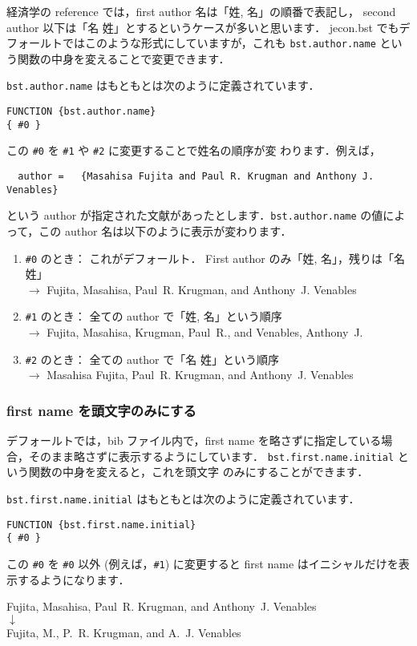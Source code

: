 \documentclass[a4j,10pt]{jarticle}
\begin{document}
経済学の reference では，first author 名は「姓, 名」の順番で表記し，
second author 以下は「名 姓」とするというケースが多いと思います． 
jecon.bst でもデフォールトではこのような形式にしていますが，これも 
\texttt{bst.author.name} という関数の中身を変えることで変更できます．

\texttt{bst.author.name} はもともとは次のように定義されています．
\begin{screen}
\begin{verbatim}
FUNCTION {bst.author.name}
{ #0 }
\end{verbatim}
\end{screen}
この \verb|#0| を \verb|#1| や \verb|#2| に変更することで姓名の順序が変
わります．例えば，
\begin{verbatim}
  author =	 {Masahisa Fujita and Paul R. Krugman and Anthony J. Venables}
\end{verbatim}
という author が指定された文献があったとします．\texttt{bst.author.name} 
の値によって，この author 名は以下のように表示が変わります．
\begin{enumerate}
 \item \verb|#0| のとき： これがデフォールト． First author のみ「姓, 
       名」，残りは「名 姓」\\
       $\rightarrow$ Fujita, Masahisa, Paul~R. Krugman, and
       Anthony~J. Venables
 \item \verb|#1| のとき： 全ての author で「姓, 名」という順序\\
       $\rightarrow$ Fujita, Masahisa, Krugman, Paul~R., and Venables, Anthony~J.
 \item \verb|#2| のとき： 全ての author で「名 姓」という順序\\
       $\rightarrow$ Masahisa Fujita, Paul~R. Krugman, and Anthony~J. Venables
\end{enumerate}

\subsubsection{first name を頭文字のみにする}

デフォールトでは，bib ファイル内で，first name を略さずに指定している場
合，そのまま略さずに表示するようにしています．
\texttt{bst.first.name.initial} という関数の中身を変えると，これを頭文字
のみにすることができます．

\texttt{bst.first.name.initial} はもともとは次のように定義されています．
\begin{screen}
\begin{verbatim}
FUNCTION {bst.first.name.initial}
{ #0 }
\end{verbatim}
\end{screen}
この \verb|#0| を \verb|#0| 以外 (例えば，\verb|#1|) に変更すると
first name はイニシャルだけを表示するようになります．
\begin{center}
Fujita, Masahisa, Paul~R. Krugman, and Anthony~J. Venables \\
 $\downarrow$ \\
Fujita, M., P.~R. Krugman, and A.~J. Venables
\end{center}
\end{document}
